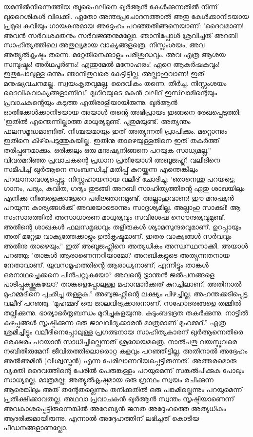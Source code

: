 യമനില്‍നിന്നെത്തിയ ത്വുഫൈലിനെ ഖുര്‍ആന്‍ കേള്‍ക്കുന്നതില്‍ നിന്ന് ഖുറൈശികള്‍ വിലക്കി. ഏതോ അന്തഃപ്രചോദനത്താല്‍ അതു കേള്‍ക്കാനിടയായ പ്രമുഖ കവിയും ഗായകനുമായ അദ്ദേഹം പറഞ്ഞതിങ്ങനെയാണ്: 'ദൈവമാണ! അവന്‍ സര്‍വശക്തനും സര്‍വജ്ഞനുമല്ലോ. ഞാനിപ്പോള്‍ ശ്രവിച്ചത് അറബി സാഹിത്യത്തിലെ അതുല്യമായ വാക്യങ്ങളത്രെ. നിസ്സംശയം, അവ അത്യുല്‍കൃഷ്ടം തന്നെ. മറ്റേതിനെക്കാളും പരിശുദ്ധവും. അവ എത്ര ആശയ സമ്പുഷ്ടം! അര്‍ഥപൂര്‍ണം! എന്തുമേല്‍ മനോഹരം! ഏറെ ആകര്‍ഷകവും! ഇതുപോലുള്ള ഒന്നും ഞാനിതുവരെ കേട്ടിട്ടില്ല. അല്ലാഹുവാണ! ഇത് മനുഷ്യവചനമല്ല. സ്വയംകൃതവുമല്ല. ദൈവികം തന്നെ, തീര്‍ച്ച. നിസ്സംശയം ദൈവികവാക്യങ്ങളാണിവ.''
മുഗീറയുടെ മകന്‍ വലീദ് ഇസ്‌ലാമിന്റെയും പ്രവാചകന്റെയും കടുത്ത എതിരാളിയായിരുന്നു. ഖുര്‍ആന്‍ ഓതിക്കേള്‍ക്കാനിടയായ അയാള്‍ തന്റെ അഭിപ്രായം ഇങ്ങനെ രേഖപ്പെടുത്തി: 'ഇതില്‍ എന്തെന്നില്ലാത്ത മാധുര്യമുണ്ട്. പുതുമയുണ്ട്. അത്യന്തം ഫലസമൃദ്ധമാണിത്. നിശ്ചയമായും ഇത് അത്യുന്നതി പ്രാപിക്കും. മറ്റൊന്നും ഇതിനെ കീഴ്‌പെടുത്തുകയില്ല. ഇതിനു താഴെയുള്ളതിനെ ഇത് തകര്‍ത്ത് തരിപ്പണമാക്കും. ഒരിക്കലും ഒരു മനുഷ്യനിങ്ങനെ പറയുക സാധ്യമല്ല.''
വിവരമറിഞ്ഞ പ്രവാചകന്റെ പ്രധാന പ്രതിയോഗി അബൂജഹ്ല്! വലീദിനെ സമീപിച്ച് ഖുര്‍ആനെ സംബന്ധിച്ച് മതിപ്പ് കുറയ്ക്കുന്ന എന്തെങ്കിലും പറയാനാവശ്യപ്പെട്ടു. നിസ്സഹായനായ വലീദ് ചോദിച്ചു: 'ഞാനെന്തു പറയട്ടെ; ഗാനം, പദ്യം, കവിത, ഗദ്യം തുടങ്ങി അറബി സാഹിത്യത്തിന്റെ ഏതു ശാഖയിലും എനിക്കു നിങ്ങളെക്കാളേറെ പരിജ്ഞാനമുണ്ട്. അല്ലാഹുവാണ! ഈ മനുഷ്യന്‍ പറയുന്ന കാര്യങ്ങള്‍ക്ക് അവയോടൊന്നും സാദൃശ്യമില്ല. അല്ലാഹു സാക്ഷി! ആ സംസാരത്തില്‍ അസാധാരണ മാധുര്യവും സവിശേഷ സൌന്ദര്യവുമുണ്ട്. അതിന്റെ ശാഖകള്‍ ഫലസമൃദ്ധവും തളിരുകള്‍ ശ്യാമസുന്ദരവുമാണ്. ഉറപ്പായും അത് മറ്റേതു വാക്യത്തേക്കാളും ഉല്‍കൃഷ്ടമാണ്. ഇതര വാക്യങ്ങള്‍ സര്‍വവും അതിനു താഴെയും.''
ഇത് അബൂജഹ്ലിനെ അത്യധികം അസ്വസ്ഥനാക്കി. അയാള്‍ പറഞ്ഞു: 'താങ്കള്‍ ആരാണെന്നറിയാമോ? അറബികളുടെ അത്യുന്നതനായ നേതാവാണ്. യുവസമൂഹത്തിന്റെ ആരാധ്യനാണ്; എന്നിട്ടും താങ്കള്‍ ഒരനാഥച്ചെക്കനെ പിന്‍പറ്റുകയോ? അവന്റെ ഭ്രാന്തന്‍ ജല്‍പനങ്ങളെ പാടിപ്പുകഴ്ത്തുകയോ? താങ്കളെപ്പോലുള്ള മഹാന്മാര്‍ക്കത് കുറച്ചിലാണ്. അതിനാല്‍ മുഹമ്മദിനെ പുഛിച്ചു തള്ളുക.''
അബൂജഹ്ലിന്റെ ലക്ഷ്യം പിഴച്ചില്ല. അഹന്തക്കടിപ്പെട്ട വലീദ് പറഞ്ഞു: 'മുഹമ്മദ് ഒരു ജാലവിദ്യക്കാരനാണ്. സഹോദരങ്ങളെ തമ്മില്‍ തല്ലിക്കുന്നു. ഭാര്യാഭര്‍തൃബന്ധം മുറിച്ചുകളയുന്നു. കുടുംബഭദ്രത തകര്‍ക്കുന്നു. നാട്ടില്‍ കുഴപ്പങ്ങള്‍ സൃഷ്ടിക്കുന്ന ഒരു ജാലവിദ്യക്കാരന്‍ മാത്രമാണ് മുഹമ്മദ്.''
എത്ര ശ്രമിച്ചിട്ടും വലീദിനെപ്പോലുള്ള പ്രഗത്ഭനായ സാഹിത്യകാരന് ഖുര്‍ആന്നെതിരെ ഒരക്ഷരം പറയാന്‍ സാധിച്ചില്ലെന്നത് ശ്രദ്ധേയമത്രെ.
നാല്‍പതു വയസ്സുവരെ നബിതിരുമേനി ജീവിതത്തിലൊരൊറ്റ കളവും പറഞ്ഞിട്ടില്ല. അതിനാല്‍ അദ്ദേഹം അല്‍അമീന്‍ (വിശ്വസ്തന്‍) എന്ന പേരിലാണറിയപ്പെട്ടിരുന്നത്. അത്തരമൊരു വ്യക്തി ദൈവത്തിന്റെ പേരില്‍ പെരുങ്കള്ളം പറയുമെന്ന് സങ്കല്‍പിക്കുക പോലും സാധ്യമല്ല. മാത്രമല്ല; അത്യുല്‍കൃഷ്ടമായ ഒരു ഗ്രന്ഥം സ്വയം രചിക്കുന്ന ആരെങ്കിലും അത് തന്റേതല്ലെന്നും തനിക്കതില്‍ ഒരു പങ്കുമില്ലെന്നും പറയുമെന്ന് പ്രതീക്ഷിക്കാവതല്ല. അഥവാ പ്രവാചകന്‍ ഖുര്‍ആന്‍ സ്വന്തം സൃഷ്ടിയാണെന്ന് അവകാശപ്പെട്ടിരുന്നെങ്കില്‍ അറേബ്യന്‍ ജനത അദ്ദേഹത്തെ അത്യധികം ആദരിക്കുമായിരുന്നു. എന്നാല്‍ അദ്ദേഹത്തിന് ലഭിച്ചത് കൊടിയ പീഡനങ്ങളാണല്ലോ.
